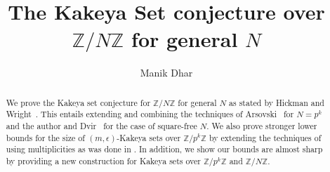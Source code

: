\documentclass{aic}
\def\Z{{\mathbb{Z}}}
\begin{document}
\begin{frontmatter}[classification=text]

\title{The Kakeya Set conjecture over $\mathbb{Z}/N\mathbb{Z}$ for general $N$} %

\author[md]{Manik Dhar}


\begin{abstract}
We prove the Kakeya set conjecture for $\mathbb{Z}/N\mathbb{Z}$ for general $N$ as stated by Hickman and Wright~\cite{hickman2018fourier}. This entails extending and combining the techniques of Arsovski~\cite{arsovski2021padic} for $N=p^k$ and the author and Dvir~\cite{dhar2021proof} for the case of square-free $N$. We also prove stronger lower bounds for the size of $(m,\epsilon)$-Kakeya sets over $\Z/p^k\Z$ by extending the techniques of \cite{arsovski2021padic} using multiplicities as was done in \cite{saraf2008,dvir2013extensions}. In addition, we show our bounds are almost sharp by providing a new construction for Kakeya sets over $\Z/p^k\Z$ and $\Z/N\Z$.
\end{abstract}
\end{frontmatter}





\end{document}
